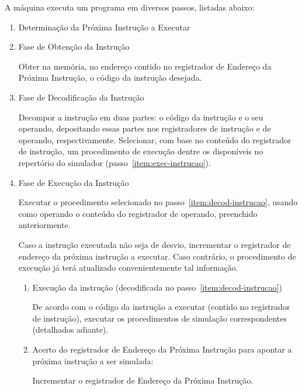 A máquina executa um programa em diversos passos, listadas abaixo:

\begin{enumerate}
	\item Determinação da Próxima Instrução a Executar
	\item Fase de Obtenção da Instrução

	Obter na memória, no endereço contido no registrador de Endereço da Próxima Instrução, o código da instrução desejada.
	
	\item Fase de Decodificação da Instrução
	\label{item:decod-instrucao}

	Decompor a instrução em duas partes: o código da instrução e o seu operando, depositando essas partes nos registradores de instrução e de operando, respectivamente. Selecionar, com base no conteúdo do registrador de instrução, um procedimento de execução dentre os disponíveis no repertório do simulador (passo~\ref{item:exec-instrucao}).

	\item Fase de Execução da Instrução
	\label{item:exec-instrucao}
	
	Executar o procedimento selecionado no passo~\ref{item:decod-instrucao}, usando como operando o conteúdo do registrador de operando, preenchido anteriormente.
	
	Caso a instrução executada não seja de desvio, incrementar o registrador de endereço da próxima instrução a executar. Caso contrário, o procedimento de execução já terá atualizado convenientemente tal informação.
	
	\begin{enumerate}
		\item Execução da instrução (decodificada no passo~\ref{item:decod-instrucao})

		De acordo com o código da instrução a executar (contido no registrador de instrução), executar os procedimentos de simulação correspondentes (detalhados adiante).
		
		\item Acerto do registrador de Endereço da Próxima Instrução para apontar a próxima instrução a ser simulada:

		Incrementar o registrador de Endereço da Próxima Instrução.
	\end{enumerate}
	
\end{enumerate}
